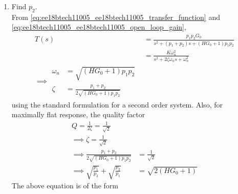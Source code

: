 \begin{enumerate}[label=\arabic*.,ref=\theenumi]
\item Find $p_2$.
\\
\solution From \eqref{eq:ee18btech11005_ee18btech11005_transfer_function} and \eqref{eq:ee18btech11005_ee18btech11005_open_loop_gain},
\begin{align}
    T(s) &= \frac{p_1p_2G_0}{s^2+(p_1+p_2)s+(HG_0+1)p_1p_2} \label{eq:ee18btech11005_ee18btech11005_closed_loop}
\\
&= \frac{K \omega_n^{2}}{s^2+2\zeta\omega_ns+\omega_n^{2}}
\\
\implies 
\begin{split}
    \omega_n &= \sqrt{(HG_0+1)p_1p_2}\\
    \zeta &= \frac{p_1+p_2}{2\sqrt{(HG_0+1)p_1p_2}}
\end{split}
\label{eq:ee18btech11005_ee18btech11005_second_order_zeta}
\end{align}
using the standard formulation for a second order system.  Also, for maximally flat response, the quality factor 
\begin{align}
    Q = \frac{1}{2\zeta}= \frac{1}{\sqrt{2}}&
\\
\implies  \zeta = \frac{1}{\sqrt{2}} &
\label{eq:ee18btech11005_ee18btech11005_second_order_zeta_q}
\\
\implies \frac{p_1+p_2}{2\sqrt{(HG_0+1)p_1p_2}} &= \frac{1}{\sqrt{2}}
\\
\implies \sqrt{\frac{p_1}{p_2}}+\sqrt{\frac{p_2}{p_1}} 
&= \sqrt{2(HG_0+1)} 
\end{align}
%
The above equation is of the form 
%
\begin{align}

\end{align}
\end{enumerate}
